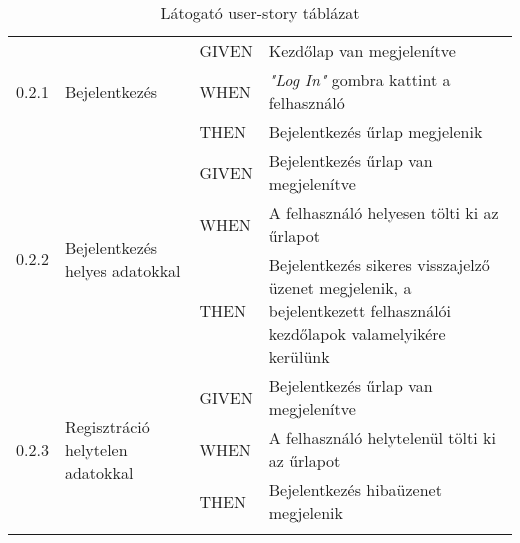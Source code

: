 \begin{center}
\begin{longtable}{ | p{} | p{} | p{} | p{} | }

			\multirow{3}{*}{0.2.1} 
			& \multirow{3}{=}{Bejelentkezés} 
			& GIVEN 
			& Kezdőlap van megjelenítve \\
			\cline{3-4}
			& & WHEN 
			& \emph{"Log In"} gombra kattint a felhasználó \\
			\cline{3-4}
			& & THEN 
			& Bejelentkezés űrlap megjelenik \\
			\hline
			
			\multirow{3}{*}{0.2.2} 
			& \multirow{3}{=}{Bejelentkezés helyes adatokkal} 
			& GIVEN 
			& Bejelentkezés űrlap van megjelenítve \\
			\cline{3-4}
			& & WHEN 
			& A felhasználó helyesen tölti ki az űrlapot \\
			\cline{3-4}
			& & THEN 
			& Bejelentkezés sikeres visszajelző üzenet megjelenik, a bejelentkezett felhasználói kezdőlapok valamelyikére kerülünk \\
			\hline

			\multirow{3}{*}{0.2.3} 
			& \multirow{3}{=}{Regisztráció helytelen adatokkal} 
			& GIVEN 
			& Bejelentkezés űrlap van megjelenítve \\
			\cline{3-4}
			& & WHEN 
			& A felhasználó helytelenül tölti ki az űrlapot \\
			\cline{3-4}
			& & THEN 
			& Bejelentkezés hibaüzenet megjelenik \\
			\hline

			\caption{Látogató user-story táblázat}
			\label{tab:userstorylatogato}       
	\end{longtable}
\end{center}


\pagebreak

